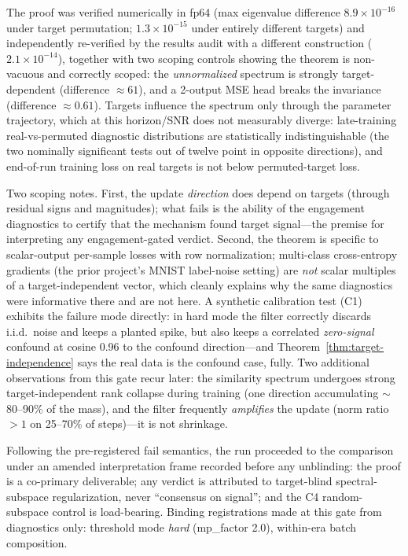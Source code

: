 The proof was verified numerically in fp64 (max eigenvalue difference
$8.9 \times 10^{-16}$ under target permutation; $1.3\times10^{-15}$ under
entirely different targets) and independently re-verified by the results
audit with a different construction ($2.1\times10^{-14}$), together with two
scoping controls showing the theorem is non-vacuous and correctly scoped:
the \emph{unnormalized} spectrum is strongly target-dependent
(difference $\approx 61$), and a 2-output MSE head breaks the invariance
(difference $\approx 0.61$). Targets influence the spectrum only through
the parameter trajectory, which at this horizon/SNR does not measurably
diverge: late-training real-vs-permuted diagnostic distributions are
statistically indistinguishable (the two nominally significant tests out of
twelve point in opposite directions), and end-of-run training loss on real
targets is not below permuted-target loss.

Two scoping notes. First, the update \emph{direction} does depend on
targets (through residual signs and magnitudes); what fails is the ability
of the engagement diagnostics to certify that the mechanism found target
signal---the premise for interpreting any engagement-gated verdict. Second,
the theorem is specific to scalar-output per-sample losses with row
normalization; multi-class cross-entropy gradients (the prior project's
MNIST label-noise setting) are \emph{not} scalar multiples of a
target-independent vector, which cleanly explains why the same diagnostics
were informative there and are not here. A synthetic calibration test
(C1) exhibits the failure mode directly: in hard mode the filter correctly
discards i.i.d.\ noise and keeps a planted spike, but also keeps a
correlated \emph{zero-signal} confound at cosine 0.96 to the confound
direction---and Theorem~\ref{thm:target-independence} says the real data is
the confound case, fully. Two additional observations from this gate recur
later: the similarity spectrum undergoes strong target-independent rank
collapse during training (one direction accumulating $\sim$80--90\% of the
mass), and the filter frequently \emph{amplifies} the update
(norm ratio $>1$ on 25--70\% of steps)---it is not shrinkage.

Following the pre-registered fail semantics, the run proceeded to the
comparison under an amended interpretation frame recorded before any
unblinding: the proof is a co-primary deliverable; any verdict is
attributed to target-blind spectral-subspace regularization, never
``consensus on signal''; and the C4 random-subspace control is
load-bearing. Binding registrations made at this gate from diagnostics
only: threshold mode \emph{hard} (mp\_factor 2.0), within-era batch
composition.

